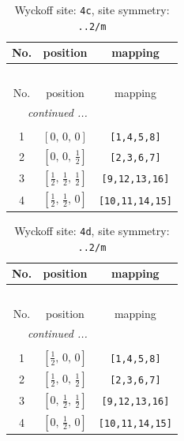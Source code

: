 \documentclass[fleqn,8pt]{jsarticle}
\begin{document}
\renewcommand{\arraystretch}{1.2}
\begin{longtable}{ccc}
\caption{Wyckoff site: {\tt 4c}, site symmetry: {\tt ..2/m}}
 \\
 \hline \hline
No. & position & mapping \\ \hline \endfirsthead

\multicolumn{2}{l}{\tablename\ \thetable{}} \\
 \hline \hline
No. & position & mapping \\ \hline \endhead

 \hline \hline
\multicolumn{2}{r}{\footnotesize\it continued ...} \\ \endfoot

 \hline \hline
\multicolumn{2}{r}{} \\ \endlastfoot

1 & $\left[ 0,\, 0,\, 0 \right]$ & {\tt [1,4,5,8]} \\ \hline
2 & $\left[ 0,\, 0,\, \frac{1}{2} \right]$ & {\tt [2,3,6,7]} \\ \hline
3 & $\left[ \frac{1}{2},\, \frac{1}{2},\, \frac{1}{2} \right]$ & {\tt [9,12,13,16]} \\ \hline
4 & $\left[ \frac{1}{2},\, \frac{1}{2},\, 0 \right]$ & {\tt [10,11,14,15]} \\
\end{longtable}
\renewcommand{\arraystretch}{1.2}
\begin{longtable}{ccc}
\caption{Wyckoff site: {\tt 4d}, site symmetry: {\tt ..2/m}}
 \\
 \hline \hline
No. & position & mapping \\ \hline \endfirsthead

\multicolumn{2}{l}{\tablename\ \thetable{}} \\
 \hline \hline
No. & position & mapping \\ \hline \endhead

 \hline \hline
\multicolumn{2}{r}{\footnotesize\it continued ...} \\ \endfoot

 \hline \hline
\multicolumn{2}{r}{} \\ \endlastfoot

1 & $\left[ \frac{1}{2},\, 0,\, 0 \right]$ & {\tt [1,4,5,8]} \\ \hline
2 & $\left[ \frac{1}{2},\, 0,\, \frac{1}{2} \right]$ & {\tt [2,3,6,7]} \\ \hline
3 & $\left[ 0,\, \frac{1}{2},\, \frac{1}{2} \right]$ & {\tt [9,12,13,16]} \\ \hline
4 & $\left[ 0,\, \frac{1}{2},\, 0 \right]$ & {\tt [10,11,14,15]} \\
\end{longtable}
\end{document}
